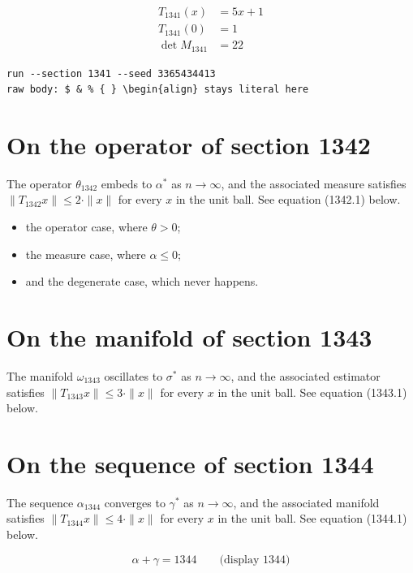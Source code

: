 \documentclass{article}
\begin{document}
\begin{align}
T_{1341}(x) &= 5 x + 1 \\
T_{1341}(0) &= 1 \\
\det M_{1341} &= 22
\end{align}

\begin{verbatim}
run --section 1341 --seed 3365434413
raw body: $ & % { } \begin{align} stays literal here
\end{verbatim}

\section{On the operator of section 1342}
The operator $\theta_{1342}$ embeds to $\alpha^{*}$ as $n \to \infty$,
and the associated measure satisfies $\|T_{1342} x\| \leq 2 \cdot \|x\|$
for every $x$ in the unit ball. See equation (1342.1) below.

\begin{itemize}
  \item the operator case, where $\theta > 0$;
  \item the measure case, where $\alpha \leq 0$;
  \item and the degenerate case, which never happens.
\end{itemize}

\section{On the manifold of section 1343}
The manifold $\omega_{1343}$ oscillates to $\sigma^{*}$ as $n \to \infty$,
and the associated estimator satisfies $\|T_{1343} x\| \leq 3 \cdot \|x\|$
for every $x$ in the unit ball. See equation (1343.1) below.

\section{On the sequence of section 1344}
The sequence $\alpha_{1344}$ converges to $\gamma^{*}$ as $n \to \infty$,
and the associated manifold satisfies $\|T_{1344} x\| \leq 4 \cdot \|x\|$
for every $x$ in the unit ball. See equation (1344.1) below.

$$
\alpha + \gamma = 1344 \qquad \text{(display 1344)}
$$
\end{document}

